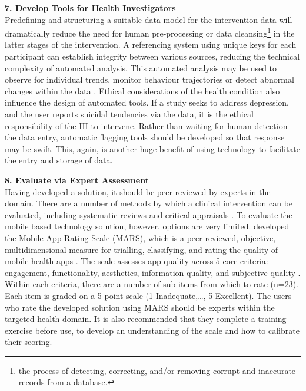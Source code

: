 \textbf{7. Develop Tools for Health Investigators} \\
Predefining and structuring a suitable data model for the intervention data will dramatically reduce the need for human pre-processing or data cleansing\footnote{the process of detecting, correcting, and/or removing corrupt and inaccurate records from a database.} in the latter stages of the intervention. A referencing system using unique keys for each participant can establish integrity between various sources, reducing the technical complexity of automated analysis.
This automated analysis may be used to observe for individual trends, monitor behaviour trajectories or detect abnormal changes within the data \cite{Hartin2015-ICOST}.
Ethical considerations of the health condition also influence the design of automated tools. If a study seeks to address depression, and the user reports suicidal tendencies via the data, it is the ethical responsibility of the HI to intervene. Rather than waiting for human detection the data entry, automatic flagging tools should be developed so that response may be swift. This, again, is another huge benefit of using technology to facilitate the entry and storage of data.

\textbf{8. Evaluate via Expert Assessment}\\
Having developed a solution, it should be peer-reviewed by experts in the domain. There are a number of methods by which a clinical intervention can be evaluated, including systematic reviews and critical appraisals \cite{Sackett1997, Morrison1999}.
To evaluate the mobile based technology solution, however, options are very limited. \citeauthor{Stoyanov2015} developed the Mobile App Rating Scale (MARS), which is a peer-reviewed, objective, multidimensional measure for trialling, classifying, and rating the quality of mobile health apps \cite{Stoyanov2015}. The scale assesses app quality across 5 core criteria: engagement, functionality, aesthetics, information quality, and subjective quality \cite{Stoyanov2015}. Within each criteria, there are a number of sub-items from which to rate (n=23). Each item is graded on a 5 point scale (1-Inadequate,\ldots, 5-Excellent).
The users who rate the developed solution using MARS should be experts within the targeted health domain. It is also recommended that they complete a training exercise before use, to develop an understanding of the scale and how to calibrate their scoring.

